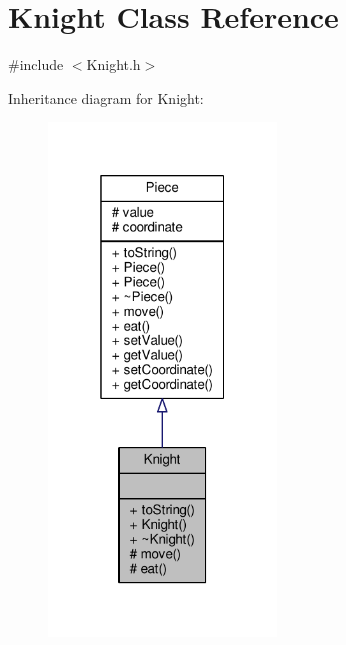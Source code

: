 \hypertarget{class_knight}{}\section{Knight Class Reference}
\label{class_knight}


{\ttfamily \#include $<$Knight.\+h$>$}



Inheritance diagram for Knight\+:
\nopagebreak
\begin{figure}[H]
\begin{center}
\leavevmode
\includegraphics[width=172pt]{class_knight__inherit__graph}
\end{center}
\end{figure}



